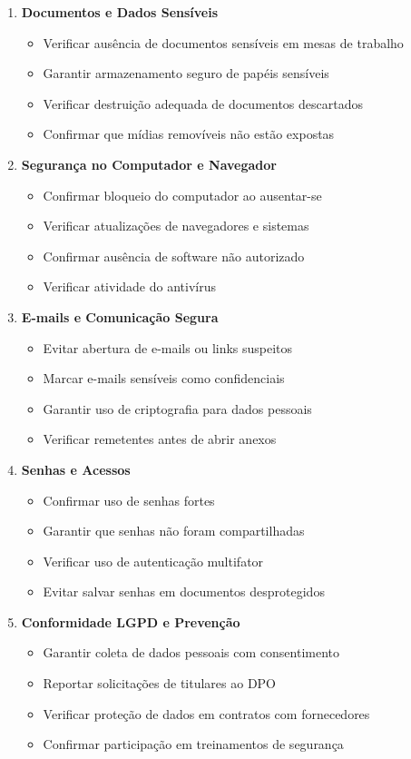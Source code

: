 \documentclass[12pt,a4paper]{report}
\begin{document}
\begin{enumerate}
  \item \textbf{Documentos e Dados Sensíveis}
  \begin{itemize}
    \item Verificar ausência de documentos sensíveis em mesas de trabalho
    \item Garantir armazenamento seguro de papéis sensíveis
    \item Verificar destruição adequada de documentos descartados
    \item Confirmar que mídias removíveis não estão expostas
  \end{itemize}

  \item \textbf{Segurança no Computador e Navegador}
  \begin{itemize}
    \item Confirmar bloqueio do computador ao ausentar-se
    \item Verificar atualizações de navegadores e sistemas
    \item Confirmar ausência de software não autorizado
    \item Verificar atividade do antivírus
  \end{itemize}

  \item \textbf{E-mails e Comunicação Segura}
  \begin{itemize}
    \item Evitar abertura de e-mails ou links suspeitos
    \item Marcar e-mails sensíveis como confidenciais
    \item Garantir uso de criptografia para dados pessoais
    \item Verificar remetentes antes de abrir anexos
  \end{itemize}

  \item \textbf{Senhas e Acessos}
  \begin{itemize}
    \item Confirmar uso de senhas fortes
    \item Garantir que senhas não foram compartilhadas
    \item Verificar uso de autenticação multifator
    \item Evitar salvar senhas em documentos desprotegidos
  \end{itemize}

  \item \textbf{Conformidade LGPD e Prevenção}
  \begin{itemize}
    \item Garantir coleta de dados pessoais com consentimento
    \item Reportar solicitações de titulares ao DPO
    \item Verificar proteção de dados em contratos com fornecedores
    \item Confirmar participação em treinamentos de segurança
  \end{itemize}


\end{enumerate}
\end{document}
